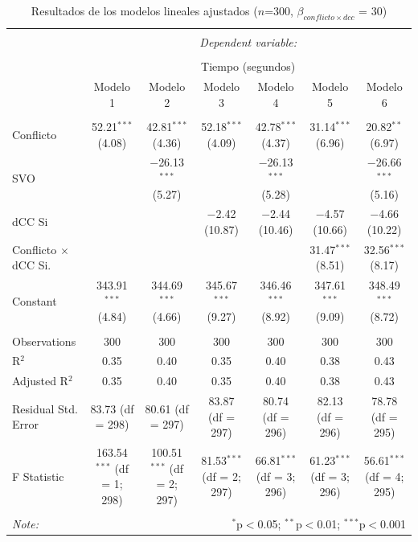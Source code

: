 \documentclass[
  spanish,
  10pt,
]{article}
\begin{document}
\begin{table}[H] \centering 
  \caption{Resultados de los modelos lineales ajustados ($n$=300, $\beta_{conflicto \times dcc}$ = 30)} 
  \label{} 
\tiny 
\begin{tabular}{@{\extracolsep{5pt}}lcccccc} 
\\[-1.8ex]\hline 
\hline \\[-1.8ex] 
 & \multicolumn{6}{c}{\textit{Dependent variable:}} \\ 
\cline{2-7} 
\\[-1.8ex] & \multicolumn{6}{c}{Tiempo (segundos)} \\ 
 & Modelo 1 & Modelo 2 & Modelo 3 & Modelo 4 & Modelo 5 & Modelo 6 \\ 
\hline \\[-1.8ex] 
 Conflicto & 52.21$^{***}$ (4.08) & 42.81$^{***}$ (4.36) & 52.18$^{***}$ (4.09) & 42.78$^{***}$ (4.37) & 31.14$^{***}$ (6.96) & 20.82$^{**}$ (6.97) \\ 
  SVO &  & $-$26.13$^{***}$ (5.27) &  & $-$26.13$^{***}$ (5.28) &  & $-$26.66$^{***}$ (5.16) \\ 
  dCC Si &  &  & $-$2.42 (10.87) & $-$2.44 (10.46) & $-$4.57 (10.66) & $-$4.66 (10.22) \\ 
  Conflicto $\times$ dCC Si. &  &  &  &  & 31.47$^{***}$ (8.51) & 32.56$^{***}$ (8.17) \\ 
  Constant & 343.91$^{***}$ (4.84) & 344.69$^{***}$ (4.66) & 345.67$^{***}$ (9.27) & 346.46$^{***}$ (8.92) & 347.61$^{***}$ (9.09) & 348.49$^{***}$ (8.72) \\ 
 \hline \\[-1.8ex] 
Observations & 300 & 300 & 300 & 300 & 300 & 300 \\ 
R$^{2}$ & 0.35 & 0.40 & 0.35 & 0.40 & 0.38 & 0.43 \\ 
Adjusted R$^{2}$ & 0.35 & 0.40 & 0.35 & 0.40 & 0.38 & 0.43 \\ 
Residual Std. Error & 83.73 (df = 298) & 80.61 (df = 297) & 83.87 (df = 297) & 80.74 (df = 296) & 82.13 (df = 296) & 78.78 (df = 295) \\ 
F Statistic & 163.54$^{***}$ (df = 1; 298) & 100.51$^{***}$ (df = 2; 297) & 81.53$^{***}$ (df = 2; 297) & 66.81$^{***}$ (df = 3; 296) & 61.23$^{***}$ (df = 3; 296) & 56.61$^{***}$ (df = 4; 295) \\ 
\hline 
\hline \\[-1.8ex] 
\textit{Note:}  & \multicolumn{6}{r}{$^{*}$p$<$0.05; $^{**}$p$<$0.01; $^{***}$p$<$0.001} \\ 
\end{tabular} 
\end{table}
\end{document}
